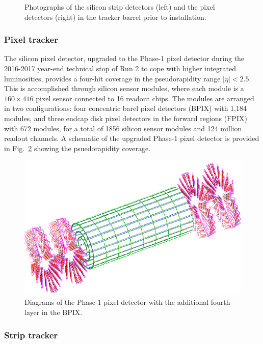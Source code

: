 \begin{figure}[H]
{    } 
    \caption{Photographs of the silicon strip detectors (left) and the pixel detectors (right) in the tracker barrel prior to installation.}
    \label{fig:Tracker}
\end{figure}

\subsubsection{Pixel tracker} \label{sec:PixelTracker}

The silicon pixel detector, upgraded to the Phase-1 pixel detector \cite{PixelUpgrade} during the 2016-2017 year-end technical stop of Run 2 to cope with higher integrated luminosities, provides a four-hit coverage in the pseudorapidity range $|\eta|<2.5$. This is accomplished through silicon sensor modules, where each module is a $160\times 416$ pixel sensor connected to 16 readout chips. The modules are arranged in two configurations: four concentric barel pixel detectors (BPIX) with 1,184 modules, and three endcap disk pixel detectors in the forward regions (FPIX) with 672 modules, for a total of 1856 silicon sensor modules and 124 million readout channels. A schematic of the upgraded Phase-1 pixel detector is provided in Fig.~\ref{fig:PixelDiagram} showing the psuedorapidity coverage.

\begin{figure}[H]
    \centering
    \includegraphics[width=\textwidth]{Images/CMS/PixelDiagram2.png}
    \caption{Diagrams of the Phase-1 pixel detector with the additional fourth layer in the BPIX.}
    \label{fig:PixelDiagram}
\end{figure}

\subsubsection{Strip tracker} \label{sec:StripTracker}

